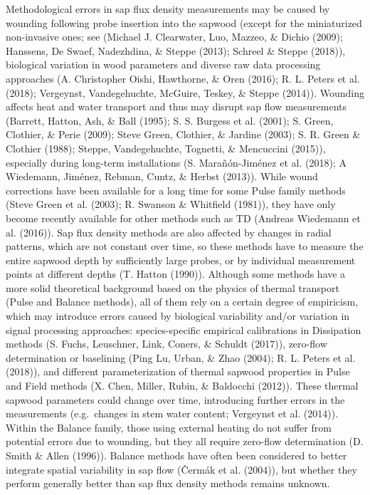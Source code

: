 \documentclass[11pt,twoside]{reedthesis}
\begin{document}
Methodological errors in sap flux density measurements may be caused by
wounding following probe insertion into the sapwood (except for the
miniaturized non-invasive ones; see (Michael J. Clearwater, Luo, Mazzeo,
\& Dichio (2009); Hanssens, De Swaef, Nadezhdina, \& Steppe (2013);
Schreel \& Steppe (2018)), biological variation in wood parameters and
diverse raw data processing approaches (A. Christopher Oishi, Hawthorne,
\& Oren (2016); R. L. Peters et al. (2018); Vergeynst, Vandegehuchte,
McGuire, Teskey, \& Steppe (2014)). Wounding affects heat and water
transport and thus may disrupt sap flow measurements (Barrett, Hatton,
Ash, \& Ball (1995); S. S. Burgess et al. (2001); S. Green, Clothier, \&
Perie (2009); Steve Green, Clothier, \& Jardine (2003); S. R. Green \&
Clothier (1988); Steppe, Vandegehuchte, Tognetti, \& Mencuccini (2015)),
especially during long-term installations (S. Marañón-Jiménez et al.
(2018); A Wiedemann, Jiménez, Rebman, Cuntz, \& Herbst (2013)). While
wound corrections have been available for a long time for some Pulse
family methods (Steve Green et al. (2003); R. Swanson \& Whitfield
(1981)), they have only become recently available for other methods such
as TD (Andreas Wiedemann et al. (2016)). Sap flux density methods are
also affected by changes in radial patterns, which are not constant over
time, so these methods have to measure the entire sapwood depth by
sufficiently large probes, or by individual measurement points at
different depths (T. Hatton (1990)). Although some methods have a more
solid theoretical background based on the physics of thermal transport
(Pulse and Balance methods), all of them rely on a certain degree of
empiricism, which may introduce errors caused by biological variability
and/or variation in signal processing approaches: species-specific
empirical calibrations in Dissipation methods (S. Fuchs, Leuschner,
Link, Coners, \& Schuldt (2017)), zero-flow determination or baselining
(Ping Lu, Urban, \& Zhao (2004); R. L. Peters et al. (2018)), and
different parameterization of thermal sapwood properties in Pulse and
Field methods (X. Chen, Miller, Rubin, \& Baldocchi (2012)). These
thermal sapwood parameters could change over time, introducing further
errors in the measurements (e.g.~changes in stem water content;
Vergeynst et al. (2014)). Within the Balance family, those using
external heating do not suffer from potential errors due to wounding,
but they all require zero-flow determination (D. Smith \& Allen (1996)).
Balance methods have often been considered to better integrate spatial
variability in sap flow (Čermák et al. (2004)), but whether they perform
generally better than sap flux density methods remains unknown.\par
\end{document}
